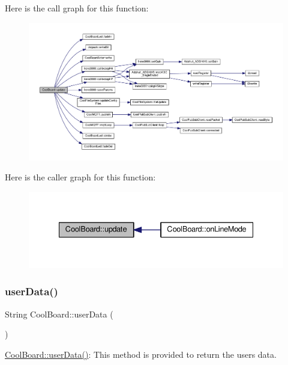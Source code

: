 Here is the call graph for this function\+:
\nopagebreak
\begin{figure}[H]
\begin{center}
\leavevmode
\includegraphics[width=350pt]{class_cool_board_a8612756d3f73198cdde857a66f0fe690_cgraph}
\end{center}
\end{figure}
Here is the caller graph for this function\+:
\nopagebreak
\begin{figure}[H]
\begin{center}
\leavevmode
\includegraphics[width=335pt]{class_cool_board_a8612756d3f73198cdde857a66f0fe690_icgraph}
\end{center}
\end{figure}
\mbox{\label{class_cool_board_ae7358fb6e623cfc81b775f5f1734909b}} 
\subsubsection{\texorpdfstring{user\+Data()}{userData()}}
{\footnotesize\ttfamily String Cool\+Board\+::user\+Data (\begin{DoxyParamCaption}{ }\end{DoxyParamCaption})}

\hyperlink{class_cool_board_ae7358fb6e623cfc81b775f5f1734909b}{Cool\+Board\+::user\+Data()}\+: This method is provided to return the user\textquotesingle{}s data.

